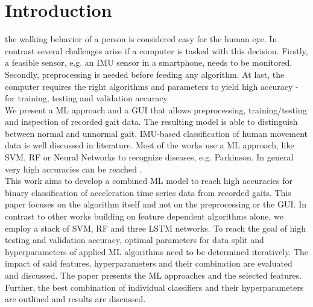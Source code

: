 \section{Introduction}
 the walking behavior of a person is considered easy for the human eye. In contrast several challenges arise if a computer is tasked with this decision. Firstly, a feasible sensor, e.g. an IMU sensor in a smartphone, needs to be monitored. Secondly, preprocessing is needed before feeding any algorithm. At last, the computer requires the right algorithms and parameters to yield high accuracy - for training, testing and validation accuracy.\\
We present a \ac{ML} approach and a \ac{GUI} that allows preprocessing, training/testing and inspection of recorded gait data. The resulting model is able to distinguish between normal and unnormal gait.
IMU-based classification of human movement data is well discussed in literature. Most of the works use a \ac{ML} approach, like \ac{SVM}, \ac{RF} or Neural Networks to recognize diseases, e.g. Parkinson. In general very high accuracies can be reached \cite{Caramia2018, Ajani2019, Cuzzolin2017}.\\
This work aims to develop a combined \ac{ML} model to reach high accuracies for binary classification of acceleration time series data from recorded gaits.
This paper focuses on the algorithm itself and not on the preprocessing or the \ac{GUI}.
In contrast to other works building on feature dependent algorithms alone, we employ a stack of \ac{SVM}, \ac{RF} and three \ac{LSTM} networks.
To reach the goal of high testing and validation accuracy, optimal parameters for data split and hyperparameters of applied \ac{ML} algorithms need to be determined iteratively.
The impact of said features, hyperparameters and their combination are evaluated and discussed.
The paper presents the \ac{ML} approaches and the selected features. Further, the best combination of individual classifiers and their hyperparameters are outlined and results are discussed.
